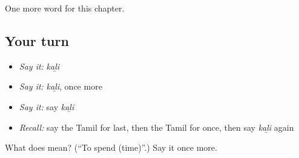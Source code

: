 \begin{grammarlens}[title={What you've built}]
One more word for this chapter.
\end{grammarlens}

\subsection*{Your turn}
\begin{itemize}
\raggedright
  \item \emph{Say it:} \emph{kaḻi}
  \item \emph{Say it:} \emph{kaḻi}, once more
  \item \emph{Say it:} say \emph{kaḻi}
  \item \emph{Recall:} say the Tamil for last, then the Tamil for once, then say \emph{kaḻi} again
\end{itemize}

\begin{tcolorbox}[breakable,colback=teal!4,colframe=teal!35!black,title={Before you move on}]
What does  mean? (\textquotedblleft{}To spend (time)\textquotedblright{}.) Say it once more.
\end{tcolorbox}
